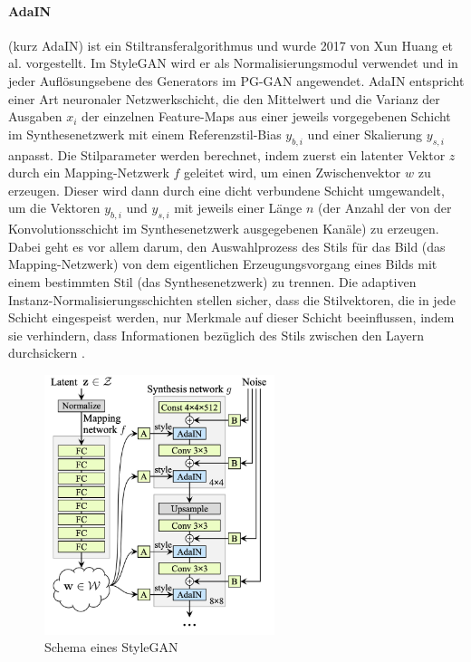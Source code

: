\paragraph[]{AdaIN}
 (kurz AdaIN) ist ein Stiltransferalgorithmus und wurde 2017 von Xun Huang et al. vorgestellt. Im StyleGAN wird er als Normalisierungsmodul verwendet und in jeder Auflösungsebene des Generators im PG-GAN angewendet. AdaIN entspricht einer Art neuronaler Netzwerkschicht, die den Mittelwert und die Varianz der Ausgaben $x_i$ der einzelnen Feature-Maps aus einer jeweils vorgegebenen Schicht im Synthesenetzwerk mit einem Referenzstil-Bias $y_{b,i}$ und einer Skalierung $y_{s,i}$ anpasst. Die Stilparameter werden berechnet, indem zuerst ein latenter Vektor $z$ durch ein Mapping-Netzwerk $f$ geleitet wird, um einen Zwischenvektor $w$ zu erzeugen. Dieser wird dann durch eine dicht verbundene Schicht umgewandelt, um die Vektoren $y_{b,i}$ und $y_{s,i}$ mit jeweils einer Länge $n$ (der Anzahl der von der Konvolutionsschicht im Synthesenetzwerk ausgegebenen Kanäle) zu erzeugen. Dabei geht es vor allem darum, den Auswahlprozess des Stils für das Bild (das Mapping-Netzwerk) von dem eigentlichen Erzeugungsvorgang eines Bilds mit einem bestimmten Stil (das Synthesenetzwerk) zu trennen. Die adaptiven Instanz-Normalisierungsschichten stellen sicher, dass die Stilvektoren, die in jede Schicht eingespeist werden, nur Merkmale auf dieser Schicht beeinflussen, indem sie verhindern, dass Informationen bezüglich des Stils zwischen den Layern durchsickern \cite[S.277f]{fos19}.
\begin{figure}[H]
    \centering
    \includegraphics[width=0.6\textwidth,angle=0]{abb/adain_StyleGAN}
    \caption[Schema eines StyleGAN]{Schema eines StyleGAN \cite{kar19}}
\end{figure}

